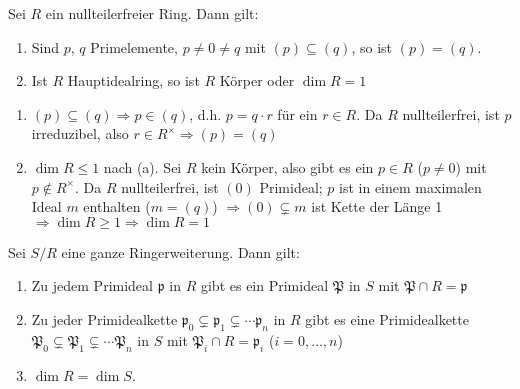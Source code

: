 \begin{Bem}
\label{2.25}
Sei $R$ ein nullteilerfreier Ring. Dann gilt: 
\begin{enumerate}
\item Sind $p$, $q$ Primelemente, $p\neq 0\neq q$ mit $(p)\subseteq (q)$, so ist
$(p)=(q)$.
\item Ist $R$ Hauptidealring, so ist $R$ K\"orper oder $\dim{R}=1$
\end{enumerate}
\end{Bem}
\begin{Bew}
\begin{enumerate}

\item $(p)\subseteq (q)\Rightarrow p\in(q)$, d.h. $p=q\cdot r$ f\"ur ein $r\in R$.
Da $R$ nullteilerfrei, ist $p$ irreduzibel, also $r\in R^{\times}\Rightarrow (p)=(q)$

\item $\dim{R}\leq 1$ nach (a). Sei $R$ kein K\"orper, also gibt es ein $p\in R$ 
($p\neq 0$) mit $p\notin R^{\times}$. Da $R$ nullteilerfrei, ist $(0)$ Primideal;
$p$ ist in einem maximalen Ideal $m$ enthalten ($m=(q)$)
$\Rightarrow (0)\subsetneq m$ ist Kette der L\"ange 1
$\Rightarrow \dim{R}\geq 1 \Rightarrow \dim{R}=1$

\end{enumerate}
\end{Bew}

\begin{Satz}
\label{Satz10}
Sei $S/R$ eine ganze Ringerweiterung. Dann gilt:
\begin{enumerate}

\item Zu jedem Primideal $\mathfrak{p}$ in $R$ gibt es ein Primideal $\mathfrak{P}$ in $S$
mit $\mathfrak{P}\cap R=\mathfrak{p}$

\item Zu jeder Primidealkette $\mathfrak{p}_0\subsetneq \mathfrak{p}_1\subsetneq \cdots
\mathfrak{p}_n$ in $R$ gibt es eine Primidealkette 
$\mathfrak{P}_0\subsetneq \mathfrak{P}_1\subsetneq \cdots \mathfrak{P}_n$ in $S$
mit $\mathfrak{P}_i\cap R=\mathfrak{p}_i$ ($i=0,\ldots, n$)

\item \label{Satz10c}$\dim{R}= \dim{S}$.

\end{enumerate}
\end{Satz}

